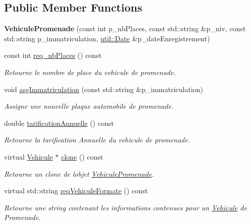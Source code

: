 \subsection*{Public Member Functions}
\begin{DoxyCompactItemize}
\item 
\mbox{\label{classsaaq_1_1VehiculePromenade_a5caaa3fa80ced57a49922fa44a127800}} 
{\bfseries Vehicule\+Promenade} (const int p\+\_\+nb\+Places, const std\+::string \&p\+\_\+niv, const std\+::string p\+\_\+immatriculation, \hyperlink{classutil_1_1Date}{util\+::\+Date} \&p\+\_\+date\+Enregistrement)
\item 
const int \hyperlink{classsaaq_1_1VehiculePromenade_a71338b24fa5d12cc432b7f7d29917b75}{req\+\_\+nb\+Places} () const
\begin{DoxyCompactList}\small\item\em Retourne le nombre de place du vehicule de promenade. \end{DoxyCompactList}\item 
void \hyperlink{classsaaq_1_1VehiculePromenade_a86cbcf72ff776c5e79dcfd9703d7121e}{asg\+Immatriculation} (const std\+::string \&p\+\_\+immatriculation)
\begin{DoxyCompactList}\small\item\em Assigne une nouvelle plaque automobile de promenade. \end{DoxyCompactList}\item 
double \hyperlink{classsaaq_1_1VehiculePromenade_ad94d645be9862d1cd86953ca8a7777b9}{tarification\+Annuelle} () const
\begin{DoxyCompactList}\small\item\em Retourne la tarification Annuelle du vehicule de promenade. \end{DoxyCompactList}\item 
virtual \hyperlink{classsaaq_1_1Vehicule}{Vehicule} $\ast$ \hyperlink{classsaaq_1_1VehiculePromenade_ac4dc7715d78c2c0aca03c0eb5818bf4a}{clone} () const
\begin{DoxyCompactList}\small\item\em Retourne un clone de l\textquotesingle{}objet \hyperlink{classsaaq_1_1VehiculePromenade}{Vehicule\+Promenade}. \end{DoxyCompactList}\item 
virtual std\+::string \hyperlink{classsaaq_1_1VehiculePromenade_a338b22f240c47613ba08f37bf717658b}{req\+Vehicule\+Formate} () const
\begin{DoxyCompactList}\small\item\em Retourne une string contenant les informations contenues pour un \hyperlink{classsaaq_1_1Vehicule}{Vehicule} de Promenade. \end{DoxyCompactList}\end{DoxyCompactItemize}
